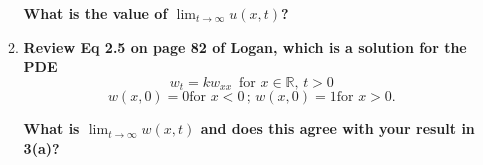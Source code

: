 \documentclass[11pt]{article}
\begin{document}
\begin{enumerate}
\begin{enumerate}
\textbf{What is the value of $\lim_{t\rightarrow \infty} u(x, t)$?}

\item \textbf{Review Eq 2.5 on page 82 of Logan, which is a solution for the PDE}
\[ w_t = kw_{xx} \, \, \, \text{for } x \in \mathbb{R}, \, t > 0\]
\[ w(x, 0) = 0 \text{for } x < 0 \, ; \, w(x, 0) = 1 \text{for } x > 0.\]

\textbf{What is $\lim_{t \rightarrow \infty} w(x, t)$ and does this agree with your result in 3(a)?}
\end{enumerate}
\end{enumerate}
\end{document}
